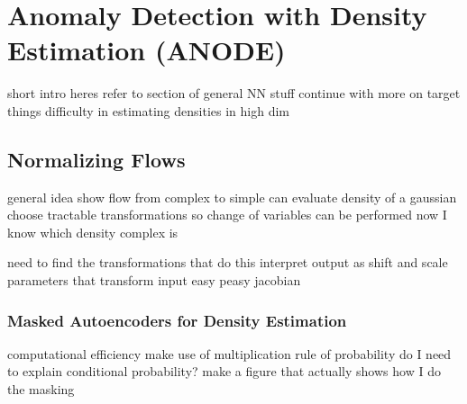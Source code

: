 \chapter{Anomaly Detection with Density Estimation (ANODE)}
\label{chap:anode}
short intro heres
refer to section of general NN stuff
continue with more on target things
difficulty in estimating densities in high dim


\section{Normalizing Flows}
\label{sec:snormFlow}
general idea show flow from complex to simple
can evaluate density of a gaussian
choose tractable transformations so change of variables can be performed
now I know which density complex is

need to find the transformations that do this
interpret output as shift and scale parameters that transform input
easy peasy jacobian


\subsection{Masked Autoencoders for Density Estimation}
\label{ssec:made}
computational efficiency \cite{Alman.12.10.2020}
make use of multiplication rule of probability
do I need to explain conditional probability?
make a figure that actually shows how I do the masking






